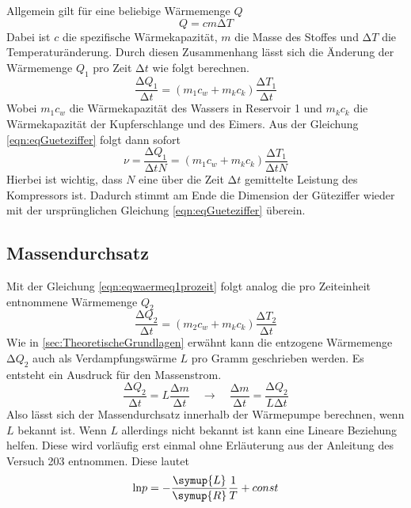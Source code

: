 Allgemein gilt für eine beliebige Wärmemenge $Q$
\begin{equation}
\label{eqn:allgwaerme}
Q = cm \increment T
\end{equation}
Dabei ist $c$ die spezifische Wärmekapazität, $m$ die Masse des Stoffes und $\increment T$ die Temperaturänderung.
Durch diesen Zusammenhang lässt sich die Änderung der Wärmemenge $Q_{1}$ pro Zeit $\increment t$ wie folgt berechnen.
\begin{equation}
\label{eqn:eqwaermeq1prozeit}
\frac{\increment Q_{1}}{\increment t} = (m_{1}c_{w} + m_{k}c_{k})\frac{\increment T_{1}}{\increment t}
\end{equation}
Wobei $m_{1}c_{w}$ die Wärmekapazität des Wassers in Reservoir 1 und $m_{k}c_{k}$ die Wärmekapazität der Kupferschlange und des Eimers.
Aus der Gleichung \eqref{eqn:eqGueteziffer} folgt dann sofort
\begin{equation}
\label{eqn:gueteziffermesswerte}
\nu = \frac{\increment Q_{1}}{\increment t N} = (m_{1}c_{w} + m_{k}c_{k})\frac{\increment T_{1}}{\increment t N}
\end{equation}
Hierbei ist wichtig, dass $N$ eine über die Zeit $\increment t$ gemittelte Leistung des Kompressors ist.
Dadurch stimmt am Ende die Dimension der Güteziffer wieder mit der ursprünglichen Gleichung \eqref{eqn:eqGueteziffer} überein.

\subsection{Massendurchsatz}
\label{sec:massedurchsatz}
Mit der Gleichung \eqref{eqn:eqwaermeq1prozeit} folgt analog die pro Zeiteinheit entnommene Wärmemenge $Q_{2}$
\begin{equation}
\label{eqn:massendurchsatz2}
\frac{\increment Q_{2}}{\increment t} = (m_{2}c_{w} + m_{k}c_{k})\frac{\increment T_{2}}{\increment t}
\end{equation}
Wie in \ref{sec:TheoretischeGrundlagen} erwähnt kann die entzogene Wärmemenge $\increment Q_{2}$ auch als Verdampfungswärme $L$ pro Gramm geschrieben werden.
Es entsteht ein Ausdruck für den Massenstrom.
\begin{equation}
\label{eqn:eqmassendurchsatz}
\frac{\increment Q_{2}}{\increment t} = L \frac{\increment m}{\increment t} \quad \to \quad \frac{\increment m}{\increment t} = \frac{\increment Q_{2}}{L \increment t}
\end{equation}
Also lässt sich der Massendurchsatz innerhalb der Wärmepumpe berechnen, wenn $L$ bekannt ist.
Wenn $L$ allerdings nicht bekannt ist kann eine Lineare Beziehung helfen. Diese wird vorläufig erst einmal ohne Erläuterung aus der Anleitung des Versuch 203 \cite{ap02} entnommen.
Diese lautet
\begin{equation}
\label{eqn:linbeziehung}
\text{ln} p = - \frac{\symup{L}}{\symup{R}} \frac{1}{T} + const
\end{equation}

